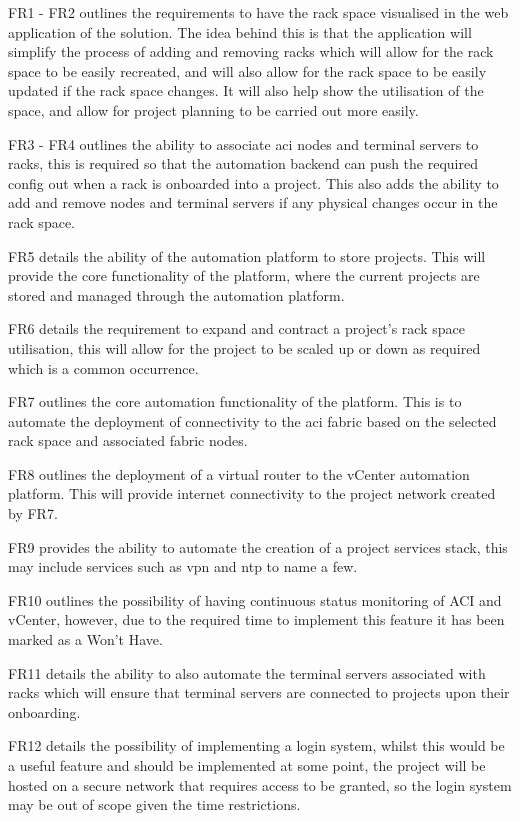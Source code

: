 FR1 - FR2 outlines the requirements to have the rack space visualised in the web application of the solution. The idea behind this is that the application will simplify the process of adding and removing racks which will allow for the rack space to be easily recreated, and will also allow for the rack space to be easily updated if the rack space changes.
It will also help show the utilisation of the space, and allow for project planning to be carried out more easily.

FR3 - FR4 outlines the ability to associate \gls{aci} nodes and terminal servers to racks, this is required so that the automation backend can push the required config out when a rack is onboarded into a project. This also adds the ability to add and remove nodes and terminal servers if any physical changes occur in the rack space.

FR5 details the ability of the automation platform to store projects. This will provide the core functionality of the platform, where the current projects are stored and managed through the automation platform.

FR6 details the requirement to expand and contract a project's rack space utilisation, this will allow for the project to be scaled up or down as required which is a common occurrence.

FR7 outlines the core automation functionality of the platform. This is to automate the deployment of connectivity to the \gls{aci} fabric based on the selected rack space and associated fabric nodes.

FR8 outlines the deployment of a virtual router to the vCenter automation platform. This will provide internet connectivity to the project network created by FR7.

FR9 provides the ability to automate the creation of a project services stack, this may include services such as \gls{vpn} and \gls{ntp} to name a few.

FR10 outlines the possibility of having continuous status monitoring of ACI and vCenter, however, due to the required time to implement this feature it has been marked as a Won’t Have.

FR11 details the ability to also automate the terminal servers associated with racks which will ensure that terminal servers are connected to projects upon their onboarding.

FR12 details the possibility of implementing a login system, whilst this would be a useful feature and should be implemented at some point, the project will be hosted on a secure network that requires access to be granted, so the login system may be out of scope given the time restrictions.
